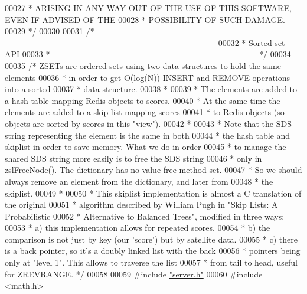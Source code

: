 \begin{DoxyCode}
00027 \textcolor{comment}{ * ARISING IN ANY WAY OUT OF THE USE OF THIS SOFTWARE, EVEN IF ADVISED OF THE}
00028 \textcolor{comment}{ * POSSIBILITY OF SUCH DAMAGE.}
00029 \textcolor{comment}{ */}
00030 
00031 \textcolor{comment}{/*-----------------------------------------------------------------------------}
00032 \textcolor{comment}{ * Sorted set API}
00033 \textcolor{comment}{ *----------------------------------------------------------------------------*/}
00034 
00035 \textcolor{comment}{/* ZSETs are ordered sets using two data structures to hold the same elements}
00036 \textcolor{comment}{ * in order to get O(log(N)) INSERT and REMOVE operations into a sorted}
00037 \textcolor{comment}{ * data structure.}
00038 \textcolor{comment}{ *}
00039 \textcolor{comment}{ * The elements are added to a hash table mapping Redis objects to scores.}
00040 \textcolor{comment}{ * At the same time the elements are added to a skip list mapping scores}
00041 \textcolor{comment}{ * to Redis objects (so objects are sorted by scores in this "view").}
00042 \textcolor{comment}{ *}
00043 \textcolor{comment}{ * Note that the SDS string representing the element is the same in both}
00044 \textcolor{comment}{ * the hash table and skiplist in order to save memory. What we do in order}
00045 \textcolor{comment}{ * to manage the shared SDS string more easily is to free the SDS string}
00046 \textcolor{comment}{ * only in zslFreeNode(). The dictionary has no value free method set.}
00047 \textcolor{comment}{ * So we should always remove an element from the dictionary, and later from}
00048 \textcolor{comment}{ * the skiplist.}
00049 \textcolor{comment}{ *}
00050 \textcolor{comment}{ * This skiplist implementation is almost a C translation of the original}
00051 \textcolor{comment}{ * algorithm described by William Pugh in "Skip Lists: A Probabilistic}
00052 \textcolor{comment}{ * Alternative to Balanced Trees", modified in three ways:}
00053 \textcolor{comment}{ * a) this implementation allows for repeated scores.}
00054 \textcolor{comment}{ * b) the comparison is not just by key (our 'score') but by satellite data.}
00055 \textcolor{comment}{ * c) there is a back pointer, so it's a doubly linked list with the back}
00056 \textcolor{comment}{ * pointers being only at "level 1". This allows to traverse the list}
00057 \textcolor{comment}{ * from tail to head, useful for ZREVRANGE. */}
00058 
00059 \textcolor{preprocessor}{#}\textcolor{preprocessor}{include} \hyperlink{server_8h}{"server.h"}
00060 \textcolor{preprocessor}{#}\textcolor{preprocessor}{include} \textcolor{preprocessor}{<}\textcolor{preprocessor}{math}\textcolor{preprocessor}{.}\textcolor{preprocessor}{h}\textcolor{preprocessor}{>}

\end{DoxyCode}
